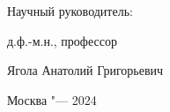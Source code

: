 \vspace{0pt plus2fill} %

\begin{flushright}
	Научный руководитель:
	
	д.ф.-м.н., профессор
	
	Ягола Анатолий Григорьевич
	
\end{flushright}

\vspace{0pt plus6fill}
\begin{center}
	Москва "--- 2024
\end{center}
